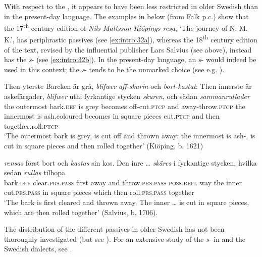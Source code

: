 \documentclass[output=paper]{langscibook}
\begin{document}
With respect to the , it appears to have been less restricted in older Swedish than in the present-day language. The examples in  below (from Falk p.c.) show that the 17\textsuperscript{th} century edition of \textit{Nils Mattsson Kiöpings resa}, ‘The journey of N. M. K.’, has periphrastic passives (see \ref{ex:intro:32a}), whereas the 18\textsuperscript{th} century edition of the text, revised by the influential publisher Lars Salvius (see  above), instead has the \textit{s}{}- (see \ref{ex:intro:32b}). In the present-day language, an \textit{s}{}- would indeed be used in this context; the \textit{s}{}- tends to be the unmarked choice (see e.g. \citealt{Engdahl2006}).


\ea\label{ex:intro:32}
\ea \label{ex:intro:32a}
\gll  Then   yterste     Barcken   är grå, \textit{blifwer}     \textit{aff-skurin} och \textit{bort-kastat}: Then innerste     är askefärgader, \textit{blifwer} uthi   fyrkantige   stycken \textit{skuren},   och   sädan \textit{sammanrullader}\\
the   outermost bark\textsc{.def}  is  grey becomes  off-cut\textsc{.ptcp}  and   away\textsc{{}-}throw.\textsc{ptcp} the     innermost   is ash.coloured   becomes  in    square     pieces cut\textsc{.ptcp} and   then     together.roll\textsc{.ptcp}\\
\glt  ‘The outermost bark is grey, is cut off and thrown away: the innermost is ash-, is cut in square pieces and then rolled together’ (Kiöping, b. 1621)

\ex \label{ex:intro:32b}
\gll  [barken] \textit{rensas} först bort och \textit{kastas} sin       kos. Den inre … \textit{skäres} i   fyrkantige   stycken,   hvilka sedan \textit{rullas} tilhopa\\
    bark.\textsc{def} clear.\textsc{prs.pass}   first away and throw.\textsc{prs.pass}   \textsc{poss.refl}   way the   inner {} cut.\textsc{prs.pass} in   square     pieces   which then     roll\textsc{.prs.pass} together\\

\glt `The bark is first cleared and thrown away. The inner … is cut in square pieces, which are then rolled together’ (Salvius, b. 1706).
\z
\z

The distribution of the different passives in older Swedish has not been thoroughly investigated (but see \citealt{Kirri1975}). For an extensive study of the \textit{s}{}- in  and the Swedish dialects, see \citet{Holm1952}.
\end{document}
